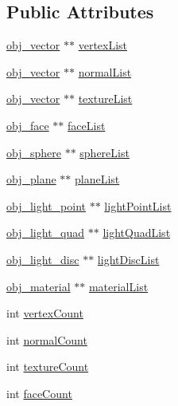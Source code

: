 \subsection*{Public Attributes}
\begin{DoxyCompactItemize}
\item 
\hyperlink{structobj__vector}{obj\+\_\+vector} $\ast$$\ast$ \hyperlink{classobj_loader_a8c5f9d7bef617f79b072b535d9eb028f}{vertex\+List}
\item 
\hyperlink{structobj__vector}{obj\+\_\+vector} $\ast$$\ast$ \hyperlink{classobj_loader_a43647083286ba91063adade5e2cfb047}{normal\+List}
\item 
\hyperlink{structobj__vector}{obj\+\_\+vector} $\ast$$\ast$ \hyperlink{classobj_loader_ae2867294c06e31d628346572f5524010}{texture\+List}
\item 
\hyperlink{structobj__face}{obj\+\_\+face} $\ast$$\ast$ \hyperlink{classobj_loader_a06d7d817bb96eb5e933c24edb6b9e20e}{face\+List}
\item 
\hyperlink{structobj__sphere}{obj\+\_\+sphere} $\ast$$\ast$ \hyperlink{classobj_loader_a1fed7e715ee71e595e971e2b6506e2a7}{sphere\+List}
\item 
\hyperlink{structobj__plane}{obj\+\_\+plane} $\ast$$\ast$ \hyperlink{classobj_loader_ad0b4e87eaf16a28c32f4739055a5548d}{plane\+List}
\item 
\hyperlink{structobj__light__point}{obj\+\_\+light\+\_\+point} $\ast$$\ast$ \hyperlink{classobj_loader_a405f92273498464b8c745c3452320afb}{light\+Point\+List}
\item 
\hyperlink{structobj__light__quad}{obj\+\_\+light\+\_\+quad} $\ast$$\ast$ \hyperlink{classobj_loader_a5b2e5ee1193c410fab4661cba21a6098}{light\+Quad\+List}
\item 
\hyperlink{structobj__light__disc}{obj\+\_\+light\+\_\+disc} $\ast$$\ast$ \hyperlink{classobj_loader_ab287d51395930cc0db3d15c046ca6102}{light\+Disc\+List}
\item 
\hyperlink{structobj__material}{obj\+\_\+material} $\ast$$\ast$ \hyperlink{classobj_loader_aed914aa0626b7a8c40ec166f483c1323}{material\+List}
\item 
int \hyperlink{classobj_loader_a77fe5afe1e9c7675f2a7469c5ad01477}{vertex\+Count}
\item 
int \hyperlink{classobj_loader_a59858bf885ec5dba5f22ea2def87bcbc}{normal\+Count}
\item 
int \hyperlink{classobj_loader_ab431118e2c3cc90fe61b1700b0bdcc01}{texture\+Count}
\item 
int \hyperlink{classobj_loader_a173464115217958dfc859b4dfefb87f4}{face\+Count}

\end{DoxyCompactItemize}
